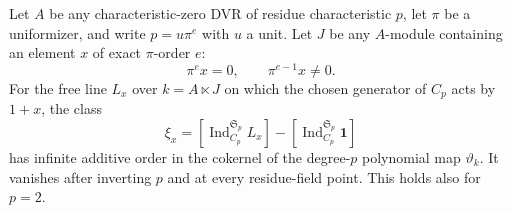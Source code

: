 \begin{theorem}
\label{C:ramified_torsion_infinite}
Let $A$ be any characteristic-zero DVR of residue characteristic
$p$, let $\pi$ be a uniformizer, and write $p=u\pi^e$ with $u$
a unit. Let $J$ be any $A$-module containing an element $x$ of
exact $\pi$-order $e$:
\[
 \pi^e x=0,\qquad \pi^{e-1}x\ne0.
\]
For the free line $L_x$ over $k=A\ltimes J$ on which the chosen
generator of $C_p$ acts by $1+x$, the class
\[
 \xi_x=[\operatorname{Ind}_{C_p}^{\mathfrak S_p}L_x]
        -[\operatorname{Ind}_{C_p}^{\mathfrak S_p}\mathbf1]
\]
has infinite additive order in the cokernel of the degree-$p$
polynomial map $\vartheta_k$. It vanishes after inverting $p$
and at every residue-field point. This holds also for $p=2$.
\end{theorem}
